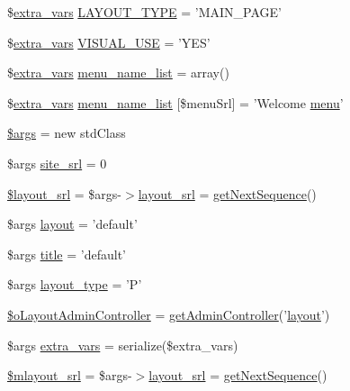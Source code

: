 \begin{DoxyCompactItemize}
\$\hyperlink{ko_8install_8php_ae1dcb37fc34a8f312d2e6abd6f806743}{extra\+\_\+vars} \hyperlink{ko_8install_8php_a559e719d2ff17f12b8fba72773e6601d}{L\+A\+Y\+O\+U\+T\+\_\+\+T\+Y\+P\+E} = 'M\+A\+I\+N\+\_\+\+P\+A\+G\+E'
\item 
\$\hyperlink{ko_8install_8php_ae1dcb37fc34a8f312d2e6abd6f806743}{extra\+\_\+vars} \hyperlink{ko_8install_8php_a7d7de44c97265901bad00952f899d833}{V\+I\+S\+U\+A\+L\+\_\+\+U\+S\+E} = 'Y\+E\+S'
\item 
\$\hyperlink{ko_8install_8php_ae1dcb37fc34a8f312d2e6abd6f806743}{extra\+\_\+vars} \hyperlink{ko_8install_8php_a9223cf55eb6ff5239c0396968e619fbe}{menu\+\_\+name\+\_\+list} = array()
\item 
\$\hyperlink{ko_8install_8php_ae1dcb37fc34a8f312d2e6abd6f806743}{extra\+\_\+vars} \hyperlink{ko_8install_8php_aab93e295f18667faa1458cf574553e1f}{menu\+\_\+name\+\_\+list} \mbox{[}\$menu\+Srl\mbox{]} = 'Welcome \hyperlink{classmenu}{menu}'
\item 
\hyperlink{ko_8install_8php_a67e94494731d99ed23b123e95175bc10}{\$args} = new std\+Class
\item 
\$args \hyperlink{ko_8install_8php_a8b1406b4ad1048041558dce6bfe89004}{site\+\_\+srl} = 0
\item 
\hyperlink{ko_8install_8php_a77889723c4aa360089caae223118d413}{\$layout\+\_\+srl} = \$args-\/$>$\hyperlink{ko_8install_8php_a70054876db09b2519a1726663c8dd9e7}{layout\+\_\+srl} = \hyperlink{func_8inc_8php_a5a97b458f9c5b4fe3574671840aee27c}{get\+Next\+Sequence}()
\item 
\$args \hyperlink{ko_8install_8php_a0dc2cdff7167f362443808ff71ae5177}{layout} = 'default'
\item 
\$args \hyperlink{ko_8install_8php_a5b072c5fd1d2228c6ba5cee13cd142e3}{title} = 'default'
\item 
\$args \hyperlink{ko_8install_8php_a0532d89570cfdaebc628afac2ff5a81b}{layout\+\_\+type} = 'P'
\item 
\hyperlink{ko_8install_8php_a6a03496003da7df71cf94d9accb430be}{\$o\+Layout\+Admin\+Controller} = \hyperlink{func_8inc_8php_a2f7ca88a5226536aca3b2f5682bd7b2d}{get\+Admin\+Controller}('\hyperlink{classlayout}{layout}')
\item 
\$args \hyperlink{ko_8install_8php_ae1dcb37fc34a8f312d2e6abd6f806743}{extra\+\_\+vars} = serialize(\$extra\+\_\+vars)
\item 
\hyperlink{ko_8install_8php_a576210f0eec2e42df2c40e04a3972bb0}{\$mlayout\+\_\+srl} = \$args-\/$>$\hyperlink{ko_8install_8php_a70054876db09b2519a1726663c8dd9e7}{layout\+\_\+srl} = \hyperlink{func_8inc_8php_a5a97b458f9c5b4fe3574671840aee27c}{get\+Next\+Sequence}()

\end{DoxyCompactItemize}
